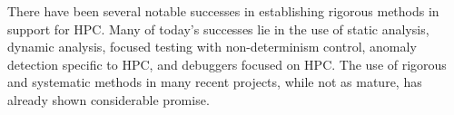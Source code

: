 \begin{WrapText}
\footnotesize

 There have been several
 notable successes in establishing
 rigorous methods in support for HPC.
 Many of today's successes lie in
 the use of
 static analysis, dynamic analysis,
 focused testing with non-determinism
 control, anomaly detection specific
 to HPC, and debuggers focused on HPC.
 The use of rigorous and systematic
 methods in many recent projects, while
 not as mature,
 has already shown considerable
 promise.
\end{WrapText}